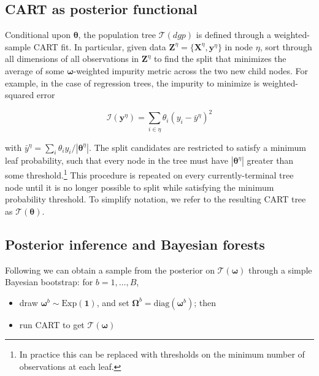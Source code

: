 \documentclass{article}
\begin{document}
\subsection{CART as posterior functional}

Conditional upon $\boldsymbol{\theta}$, the population tree
$\mathcal{T}(dgp)$ is defined through a weighted-sample
CART fit. In particular, given data
$\mathbf{Z}^\eta = \{\mathbf{X}^\eta,\mathbf{y}^\eta\}$ in node $\eta$,
sort through all dimensions of all observations in $\mathbf{Z}^\eta$ to
find the split that minimizes the average of some $\boldsymbol{\omega}$-weighted
impurity metric across the two new child nodes. For example, in the case
of regression trees, the impurity to minimize is
weighted-squared error

\begin{equation}
\mathcal{I}(\mathbf{y}^\eta) = \sum_{i\in \eta} \theta_i (y_i - \bar y^\eta )^2
\end{equation}

with $\bar y^\eta = \sum_i \theta_i y_i/|\boldsymbol{\theta}^\eta|$. The split
candidates are restricted to satisfy a minimum leaf probability, such that
every node in the tree must have  $|\boldsymbol{\theta}^\eta|$ greater than
some threshold.\footnote{In practice this can be replaced with thresholds on
the minimum number of observations at each leaf.}   This  procedure is
repeated on every currently-terminal tree node until it is no longer possible
to split while satisfying the minimum probability threshold. To simplify
notation, we refer to the resulting CART tree as
$\mathcal{T}(\boldsymbol{\theta})$.




\subsection{Posterior inference and Bayesian
forests}\label{posterior-inference-and-bayesian-forests}



Following \cite{rubin_bayesian_1981} we can obtain a sample from the
posterior on $\mathcal{T}(\boldsymbol{\omega})$ through a simple
Bayesian bootstrap: for $b=1,\dots, B$,

\begin{itemize}
\itemsep1pt\parskip0pt
\item
  draw $\boldsymbol{\omega}^b \sim \mathrm{Exp}(\mathbf{1})$, and set
  $\boldsymbol{\Omega}^b = \mathrm{diag}(\boldsymbol{\omega}^b)$; then
\item
  run CART to get $\mathcal{T}(\boldsymbol{\omega})$
\end{itemize}
\end{document}
